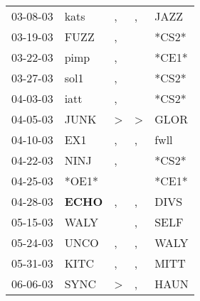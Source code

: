 \begin{supertabular}{p{0.07\textwidth}p{0.06\textwidth}p{0.02\textwidth}p{0.02\textwidth}p{0.06\textwidth}}
          03-08-03\textsuperscript{} &           kats\textsuperscript{} &                , &                , &           JAZZ\textsuperscript{} \\
          03-19-03\textsuperscript{} &           FUZZ\textsuperscript{} &                , &                  &                            *CS2* \\
          03-22-03\textsuperscript{} &           pimp\textsuperscript{} &                , &                  &                            *CE1* \\
          03-27-03\textsuperscript{} &           sol1\textsuperscript{} &                , &                  &                            *CS2* \\
          04-03-03\textsuperscript{} &           iatt\textsuperscript{} &                , &                  &                            *CS2* \\
          04-05-03\textsuperscript{} &           JUNK\textsuperscript{} &     \textgreater &     \textgreater &           GLOR\textsuperscript{} \\
          04-10-03\textsuperscript{} &            EX1\textsuperscript{} &                , &                , &           fwll\textsuperscript{} \\
          04-22-03\textsuperscript{} &           NINJ\textsuperscript{} &                , &                  &                            *CS2* \\
          04-25-03\textsuperscript{} &                            *OE1* &                  &                  &                            *CE1* \\
          04-28-03\textsuperscript{} &  \textbf{ECHO\textsuperscript{}} &                , &                , &           DIVS\textsuperscript{} \\
          05-15-03\textsuperscript{} &           WALY\textsuperscript{} &                  &                , &           SELF\textsuperscript{} \\
          05-24-03\textsuperscript{} &           UNCO\textsuperscript{} &                , &                , &           WALY\textsuperscript{} \\
          05-31-03\textsuperscript{} &           KITC\textsuperscript{} &                , &                , &           MITT\textsuperscript{} \\
          06-06-03\textsuperscript{} &           SYNC\textsuperscript{} &     \textgreater &                , &           HAUN\textsuperscript{} \\

\end{supertabular}
